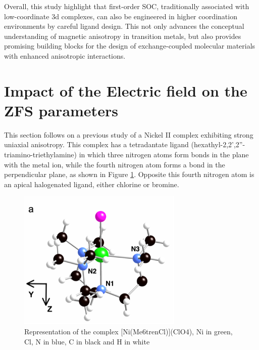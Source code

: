 \documentclass[12pt]{report}
\numberwithin{equation}{section}
\begin{document}
Overall, this study highlight that first-order SOC, traditionally associated with low-coordinate 3d complexes, can also be engineered in higher coordination environments by careful ligand design.
This not only advances the conceptual understanding of magnetic anisotropy in transition metals, but also provides promising building blocks for the design of exchange-coupled molecular materials with enhanced anisotropic interactions.


\newpage


\newpage

\section{Impact of the Electric field on the ZFS parameters}

This section follows on a previous study of a Nickel II complex exhibiting strong uniaxial anisotropy.
This complex has a tetradantate ligand (hexathyl-2,2',2''-triamino-triethylamine) in which three nitrogen atoms form bonds in the plane with the metal ion, while the fourth nitrogen atom forms a bond in the perpendicular plane, as shown in Figure \ref{NiMe6tren}.
Opposite this fourth nitrogen atom is an apical halogenated ligand, either chlorine or bromine.

\begin{figure}[!ht]
    \centering
    \includegraphics[width=0.7\textwidth]{Images/NiMe6trenTalal.png}
    \caption{Representation of the complex [Ni(Me6trenCl)](ClO4), Ni in green, Cl, N in blue, C in black and H in white}
    \label{NiMe6tren}
\end{figure}
\end{document}
